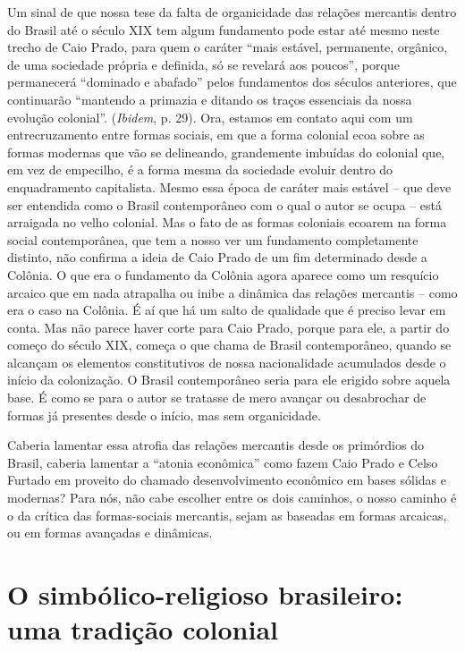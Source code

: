 Um sinal de que nossa tese da falta de organicidade das relações
mercantis dentro do Brasil até o século XIX tem algum fundamento pode
estar até mesmo neste trecho de Caio Prado, para quem o caráter ``mais
estável, permanente, orgânico, de uma sociedade própria e definida, só
se revelará aos poucos'', porque permanecerá ``dominado e abafado''
pelos fundamentos dos séculos anteriores, que continuarão ``mantendo a
primazia e ditando os traços essenciais da nossa evolução colonial''.
(\emph{Ibidem}, p. 29). Ora, estamos em contato aqui com um
entrecruzamento entre formas sociais, em que a forma colonial ecoa sobre
as formas modernas que vão se delineando, grandemente imbuídas do
colonial que, em vez de empecilho, é a forma mesma da sociedade evoluir
dentro do enquadramento capitalista. Mesmo essa época de caráter mais
estável -- que deve ser entendida como o Brasil contemporâneo com o qual
o autor se ocupa -- está arraigada no velho colonial. Mas o fato de as
formas coloniais ecoarem na forma social contemporânea, que tem a nosso
ver um fundamento completamente distinto, não confirma a ideia de Caio
Prado de um fim determinado desde a Colônia. O que era o fundamento da
Colônia agora aparece como um resquício arcaico que em nada atrapalha ou
inibe a dinâmica das relações mercantis -- como era o caso na Colônia. É
aí que há um salto de qualidade que é preciso levar em conta. Mas não
parece haver corte para Caio Prado, porque para ele, a partir do começo
do século XIX, começa o que chama de Brasil contemporâneo, quando se
alcançam os elementos constitutivos de nossa nacionalidade acumulados
desde o início da colonização. O Brasil contemporâneo seria para ele
erigido sobre aquela base. É como se para o autor se tratasse de mero
avançar ou desabrochar de formas já presentes desde o início, mas sem
organicidade.

Caberia lamentar essa atrofia das relações mercantis desde os primórdios
do Brasil, caberia lamentar a ``atonia econômica'' como fazem Caio Prado
e Celso Furtado em proveito do chamado desenvolvimento econômico em
bases sólidas e modernas? Para nós, não cabe escolher entre os dois
caminhos, o nosso caminho é o da crítica das formas-sociais mercantis,
sejam as baseadas em formas arcaicas, ou em formas avançadas e
dinâmicas.

\section{O simbólico-religioso brasileiro: uma tradição colonial}

